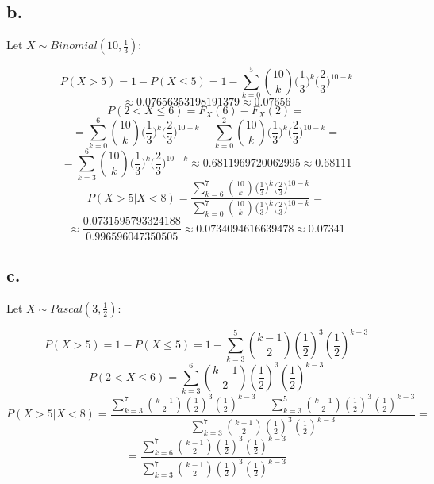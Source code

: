 \documentclass{article}
\begin{document}
\subsection*{b.}

Let \(X \sim Binomial(10, \frac{1}{3})\):


\begin{equation*}
    P(X > 5) = 1 - P(X \leq 5) = 1-  \sum_{k=0}^{5}\binom{10}{k}\Big(\frac{1}{3}\Big)^{k}\Big(\frac{2}{3}\Big)^{10-k}
\end{equation*}
\begin{equation*}
    \approx 0.07656353198191379 \approx 0.07656
\end{equation*}
\begin{equation*}
    P(2 < X \leq 6) = F_{X}(6) -  F_{X}(2) = 
\end{equation*}
\begin{equation*}
    = \sum_{k=0}^{6}\binom{10}{k}\Big(\frac{1}{3}\Big)^{k}\Big(\frac{2}{3}\Big)^{10-k} - \sum_{k=0}^{2}\binom{10}{k}\Big(\frac{1}{3}\Big)^{k}\Big(\frac{2}{3}\Big)^{10-k} =
\end{equation*}
\begin{equation*}
    = \sum_{k=3}^{6}\binom{10}{k}\Big(\frac{1}{3}\Big)^{k}\Big(\frac{2}{3}\Big)^{10-k} \approx 0.6811969720062995 \approx 0.68111
\end{equation*}
\begin{equation*}
    P(X>5|X<8) = \frac{\sum_{k=6}^{7}\binom{10}{k}\Big(\frac{1}{3}\Big)^{k}\Big(\frac{2}{3}\Big)^{10-k}}{\sum_{k=0}^{7}\binom{10}{k}\Big(\frac{1}{3}\Big)^{k}\Big(\frac{2}{3}\Big)^{10-k}} =
\end{equation*}
\begin{equation*}
    \approx \frac{0.0731595793324188}{0.996596047350505} \approx 0.0734094616639478 \approx 0.07341
\end{equation*}

\subsection*{c.}

Let \(X \sim Pascal(3, \frac{1}{2})\):

\begin{equation*}
    P(X > 5) = 1 - P(X \leq 5) = 1 - \sum_{k=3}^{5} \binom{k-1}{2}(\frac{1}{2})^{3}(\frac{1}{2})^{k-3}
\end{equation*}
\begin{equation*}
    P(2 < X \leq 6) = \sum_{k=3}^{6} \binom{k-1}{2}(\frac{1}{2})^{3}(\frac{1}{2})^{k-3}
\end{equation*}
\begin{equation*}
    P(X>5|X<8) = \frac{\sum_{k=3}^{7} \binom{k-1}{2}(\frac{1}{2})^{3}(\frac{1}{2})^{k-3} - \sum_{k=3}^{5} \binom{k-1}{2}(\frac{1}{2})^{3}(\frac{1}{2})^{k-3}}{\sum_{k=3}^{7} \binom{k-1}{2}(\frac{1}{2})^{3}(\frac{1}{2})^{k-3}} =
\end{equation*}
\begin{equation*}
    = \frac{\sum_{k=6}^{7} \binom{k-1}{2}(\frac{1}{2})^{3}(\frac{1}{2})^{k-3}}{\sum_{k=3}^{7} \binom{k-1}{2}(\frac{1}{2})^{3}(\frac{1}{2})^{k-3}}
\end{equation*}
\end{document}
